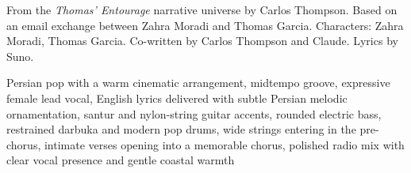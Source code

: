 
\begin{notes}
From the \emph{Thomas’ Entourage} narrative universe by Carlos Thompson. Based on an email exchange between Zahra Moradi and Thomas Garcia. Characters: Zahra Moradi, Thomas Garcia. Co-written by Carlos Thompson and Claude. Lyrics by Suno.
\end{notes}
\begin{style}
Persian pop with a warm cinematic arrangement, midtempo groove, expressive female lead vocal, English lyrics delivered with subtle Persian melodic ornamentation, santur and nylon-string guitar accents, rounded electric bass, restrained darbuka and modern pop drums, wide strings entering in the pre-chorus, intimate verses opening into a memorable chorus, polished radio mix with clear vocal presence and gentle coastal warmth
\end{style}
